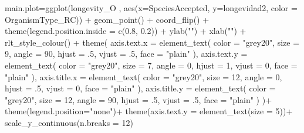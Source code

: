 \documentclass[
  12pt,
  letterpaper,
]{book}
\newenvironment{Shaded}{\begin{snugshade}}{\end{snugshade}}
\newcommand{\AttributeTok}[1]{\textcolor[rgb]{0.40,0.45,0.13}{#1}}
\newcommand{\DecValTok}[1]{\textcolor[rgb]{0.68,0.00,0.00}{#1}}
\newcommand{\FloatTok}[1]{\textcolor[rgb]{0.68,0.00,0.00}{#1}}
\newcommand{\FunctionTok}[1]{\textcolor[rgb]{0.28,0.35,0.67}{#1}}
\newcommand{\NormalTok}[1]{\textcolor[rgb]{0.00,0.23,0.31}{#1}}
\newcommand{\OtherTok}[1]{\textcolor[rgb]{0.00,0.23,0.31}{#1}}
\newcommand{\SpecialCharTok}[1]{\textcolor[rgb]{0.37,0.37,0.37}{#1}}
\newcommand{\StringTok}[1]{\textcolor[rgb]{0.13,0.47,0.30}{#1}}
\begin{document}
\begin{Shaded}
\begin{Highlighting}[]
\NormalTok{main.plot}\OtherTok{=}\FunctionTok{ggplot}\NormalTok{(longevity\_O , }\FunctionTok{aes}\NormalTok{(}\AttributeTok{x=}\NormalTok{SpeciesAccepted, }\AttributeTok{y=}\NormalTok{longevidad2, }\AttributeTok{color =}\NormalTok{ OrganismType\_RC)) }\SpecialCharTok{+}
  \FunctionTok{geom\_point}\NormalTok{() }\SpecialCharTok{+}
 \FunctionTok{coord\_flip}\NormalTok{() }\SpecialCharTok{+}
  \FunctionTok{theme}\NormalTok{(}\AttributeTok{legend.position.inside =} \FunctionTok{c}\NormalTok{(}\FloatTok{0.8}\NormalTok{, }\FloatTok{0.2}\NormalTok{)) }\SpecialCharTok{+}
  \FunctionTok{ylab}\NormalTok{(}\StringTok{""}\NormalTok{) }\SpecialCharTok{+}
  \FunctionTok{xlab}\NormalTok{(}\StringTok{""}\NormalTok{) }\SpecialCharTok{+}
  \FunctionTok{rlt\_style\_colour}\NormalTok{() }\SpecialCharTok{+}
  \FunctionTok{theme}\NormalTok{(}
    \AttributeTok{axis.text.x =} \FunctionTok{element\_text}\NormalTok{(}
      \AttributeTok{color =} \StringTok{"grey20"}\NormalTok{,}
      \AttributeTok{size =} \DecValTok{9}\NormalTok{,}
      \AttributeTok{angle =} \DecValTok{90}\NormalTok{,}
      \AttributeTok{hjust =}\NormalTok{ .}\DecValTok{5}\NormalTok{,}
      \AttributeTok{vjust =}\NormalTok{ .}\DecValTok{5}\NormalTok{,}
      \AttributeTok{face =} \StringTok{"plain"}
\NormalTok{    ),}
    \AttributeTok{axis.text.y =} \FunctionTok{element\_text}\NormalTok{(}
      \AttributeTok{color =} \StringTok{"grey20"}\NormalTok{,}
      \AttributeTok{size =} \DecValTok{7}\NormalTok{,}
      \AttributeTok{angle =} \DecValTok{0}\NormalTok{,}
      \AttributeTok{hjust =} \DecValTok{1}\NormalTok{,}
      \AttributeTok{vjust =} \DecValTok{0}\NormalTok{,}
      \AttributeTok{face =} \StringTok{"plain"}
\NormalTok{    ),}
    \AttributeTok{axis.title.x =} \FunctionTok{element\_text}\NormalTok{(}
      \AttributeTok{color =} \StringTok{"grey20"}\NormalTok{,}
      \AttributeTok{size =} \DecValTok{12}\NormalTok{,}
      \AttributeTok{angle =} \DecValTok{0}\NormalTok{,}
      \AttributeTok{hjust =}\NormalTok{ .}\DecValTok{5}\NormalTok{,}
      \AttributeTok{vjust =} \DecValTok{0}\NormalTok{,}
      \AttributeTok{face =} \StringTok{"plain"}
\NormalTok{    ),}
    \AttributeTok{axis.title.y =} \FunctionTok{element\_text}\NormalTok{(}
      \AttributeTok{color =} \StringTok{"grey20"}\NormalTok{,}
      \AttributeTok{size =} \DecValTok{12}\NormalTok{,}
      \AttributeTok{angle =} \DecValTok{90}\NormalTok{,}
      \AttributeTok{hjust =}\NormalTok{ .}\DecValTok{5}\NormalTok{,}
      \AttributeTok{vjust =}\NormalTok{ .}\DecValTok{5}\NormalTok{,}
      \AttributeTok{face =} \StringTok{"plain"}
\NormalTok{    )}
\NormalTok{  )}\SpecialCharTok{+}
  \FunctionTok{theme}\NormalTok{(}\AttributeTok{legend.position=}\StringTok{"none"}\NormalTok{)}\SpecialCharTok{+}
  \FunctionTok{theme}\NormalTok{(}\AttributeTok{axis.text.y =} \FunctionTok{element\_text}\NormalTok{(}\AttributeTok{size =} \DecValTok{5}\NormalTok{))}\SpecialCharTok{+}
  \FunctionTok{scale\_y\_continuous}\NormalTok{(}\AttributeTok{n.breaks =} \DecValTok{12}\NormalTok{)}


\end{Highlighting}
\end{Shaded}
\end{document}
